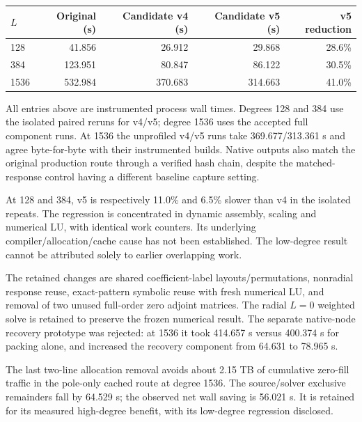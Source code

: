\documentclass[11pt,a4paper]{article}
\begin{document}
\begin{center}
\small
\begin{tabular}{lrrrr}
\toprule
$L$ & Original (s) & Candidate v4 (s) & Candidate v5 (s) & v5 reduction \\
\midrule
128 & 41.856 & 26.912 & 29.868 & 28.6\% \\
384 & 123.951 & 80.847 & 86.122 & 30.5\% \\
1536 & 532.984 & 370.683 & 314.663 & 41.0\% \\
\bottomrule
\end{tabular}
\end{center}
All entries above are instrumented process wall times. Degrees 128 and 384 use the isolated paired reruns for v4/v5; degree 1536 uses the accepted full component runs. At 1536 the unprofiled v4/v5 runs take 369.677/313.361 s and agree byte-for-byte with their instrumented builds. Native outputs also match the original production route through a verified hash chain, despite the matched-response control having a different baseline capture setting.

At 128 and 384, v5 is respectively 11.0\% and 6.5\% slower than v4 in the isolated repeats. The regression is concentrated in dynamic assembly, scaling and numerical LU, with identical work counters. Its underlying compiler/allocation/cache cause has not been established. The low-degree result cannot be attributed solely to earlier overlapping work.

The retained changes are shared coefficient-label layouts/permutations, nonradial response reuse, exact-pattern symbolic reuse with fresh numerical LU, and removal of two unused full-order zero adjoint matrices. The radial $L=0$ weighted solve is retained to preserve the frozen numerical result. The separate native-node recovery prototype was rejected: at 1536 it took 414.657 s versus 400.374 s for packing alone, and increased the recovery component from 64.631 to 78.965 s.

\newpage
The last two-line allocation removal avoids about 2.15 TB of cumulative zero-fill traffic in the pole-only cached route at degree 1536. The source/solver exclusive remainders fall by 64.529 s; the observed net wall saving is 56.021 s. It is retained for its measured high-degree benefit, with its low-degree regression disclosed.
\end{document}
